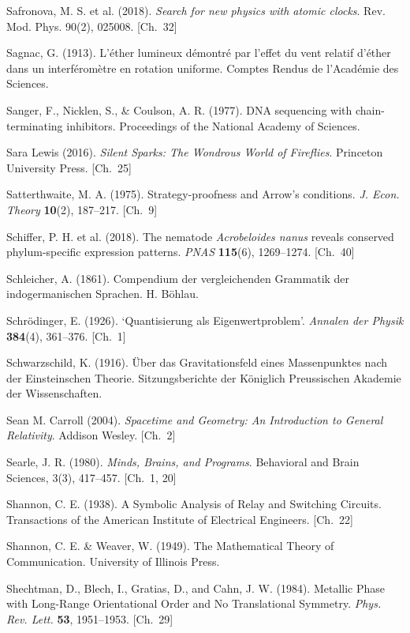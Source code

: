 \begin{list}{}{%
  \setlength{\leftmargin}{2em}%
  \setlength{\itemindent}{-2em}%
  \setlength{\itemsep}{0.35\baselineskip}%
  \setlength{\parsep}{0pt}%
  \setlength{\topsep}{0.5em}}
\item Safronova, M. S. et al. (2018). \textit{Search for new physics with atomic clocks}. Rev. Mod. Phys. 90(2), 025008. \hfill {\scriptsize [Ch.~32]}
\item Sagnac, G. (1913). L'éther lumineux démontré par l'effet du vent relatif d'éther dans un interféromètre en rotation uniforme. Comptes Rendus de l'Académie des Sciences.
\item Sanger, F., Nicklen, S., \& Coulson, A. R. (1977). DNA sequencing with chain-terminating inhibitors. Proceedings of the National Academy of Sciences.
\item Sara Lewis (2016). \textit{Silent Sparks: The Wondrous World of Fireflies}. Princeton University Press. \hfill {\scriptsize [Ch.~25]}
\item Satterthwaite, M. A. (1975). Strategy-proofness and Arrow's conditions. \textit{J. Econ. Theory} \textbf{10}(2), 187–217. \hfill {\scriptsize [Ch.~9]}
\item Schiffer, P. H. et al. (2018). The nematode \textit{Acrobeloides nanus} reveals conserved phylum-specific expression patterns. \textit{PNAS} \textbf{115}(6), 1269–1274. \hfill {\scriptsize [Ch.~40]}
\item Schleicher, A. (1861). Compendium der vergleichenden Grammatik der indogermanischen Sprachen. H. Böhlau.
\item Schrödinger, E. (1926). `Quantisierung als Eigenwertproblem'. \textit{Annalen der Physik} \textbf{384}(4), 361–376. \hfill {\scriptsize [Ch.~1]}
\item Schwarzschild, K. (1916). Über das Gravitationsfeld eines Massenpunktes nach der Einsteinschen Theorie. Sitzungsberichte der Königlich Preussischen Akademie der Wissenschaften.
\item Sean M. Carroll (2004). \textit{Spacetime and Geometry: An Introduction to General Relativity}. Addison Wesley. \hfill {\scriptsize [Ch.~2]}
\item Searle, J. R. (1980). \textit{Minds, Brains, and Programs}. Behavioral and Brain Sciences, 3(3), 417–457. \hfill {\scriptsize [Ch.~1, 20]}
\item Shannon, C. E. (1938). A Symbolic Analysis of Relay and Switching Circuits. Transactions of the American Institute of Electrical Engineers. \hfill {\scriptsize [Ch.~22]}
\item Shannon, C. E. \& Weaver, W. (1949). The Mathematical Theory of Communication. University of Illinois Press.
\item Shechtman, D., Blech, I., Gratias, D., and Cahn, J. W. (1984). Metallic Phase with Long-Range Orientational Order and No Translational Symmetry. \textit{Phys. Rev. Lett.} \textbf{53}, 1951–1953. \hfill {\scriptsize [Ch.~29]}

\end{list}
